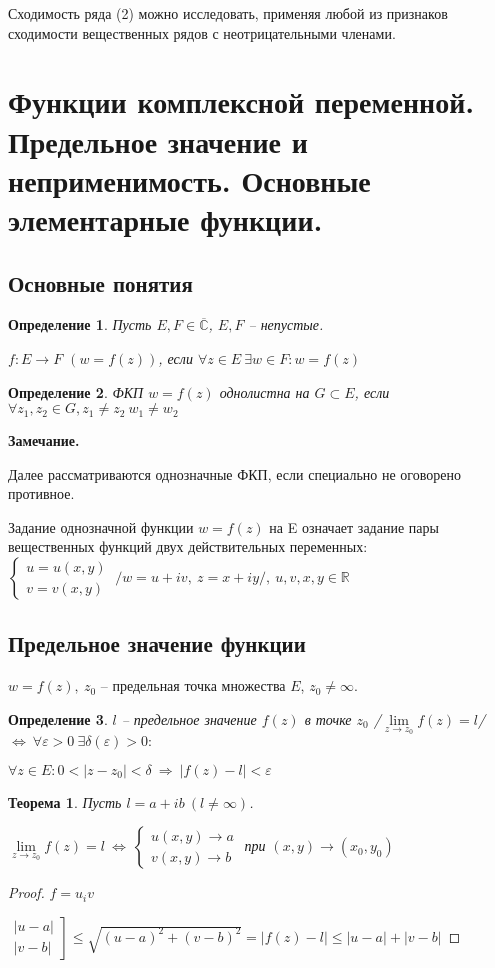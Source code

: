\documentclass[draft]{report}
\newcommand{\then}{\ \Rightarrow\ }
\newcommand{\R}{\mathbb{R}}
\renewcommand{\C}{\mathbb{C}}
\newcommand{\mlim}[1]{\underset{#1}{\lim}}
\newcommand{\LRA}{\Leftrightarrow}
\renewcommand{\bar}{\overline}
\newcommand{\e}{\varepsilon}
\newcommand{\CC}{\bar{\C}}
\newcommand{\sys}[1]{\left\{\begin{matrix}#1\end{matrix}\right.}
\newcommand{\opr}[1]{\begin{opred}#1\end{opred}}
\newtheorem*{theor}{Теорема}
\newtheorem*{opred}{Определение}
\theoremstyle{remark}
\begin{document}
Сходимость ряда (2) можно исследовать, применяя любой из признаков сходимости вещественных рядов с неотрицательными членами.

\section{Функции комплексной переменной. Предельное значение и неприменимость. Основные элементарные функции.}

\subsection{Основные понятия}

\opr{Пусть $E,F\in\CC$, $E,F$ -- непустые.

$f\colon E\to F$ $(w=f(z))$, если $\forall z\in E\ \exists w\in F\colon w=f(z)$}

\opr{ФКП $w=f(z)$ однолистна на $G\subset E$, если $\forall z_1,z_2\in G,z_1\neq z_2\ w_1\neq w_2$}

{\bfseries Замечание.}

Далее рассматриваются однозначные ФКП, если специально не оговорено противное.

Задание однозначной функции $w=f(z)$ на E означает задание пары вещественных функций двух действительных переменных: $\sys{u=u(x,y)\\v=v(x,y)}\ /w=u+iv,\ z=x+iy/,\ u,v,x,y\in\R$

\subsection{Предельное значение функции}

$w=f(z),\ z_0$ -- предельная точка множества $E$, $z_0\neq\infty$.

\opr{$l$ -- предельное значение $f(z)$ в точке $z_0$ /$\mlim{z\to z_0}f(z)=l$/ $\LRA\ \forall\e>0\ \exists\delta(\e)>0\colon$

$\forall z\in E\colon 0<|z-z_0|<\delta \then |f(z)-l|<\e$}

\begin{theor}
Пусть $l=a+ib\ (l\neq\infty)$.

$\mlim{z\to z_0}f(z)=l\ \LRA\ \sys{u(x,y)\to a \\ v(x,y)\to b}$ при $(x,y)\to(x_0,y_0)$
\end{theor}

\begin{proof}
$f=u_iv$

$\left.\begin{matrix}|u-a|\\|v-b|\end{matrix}\right]\leq\sqrt{(u-a)^2+(v-b)^2}=|f(z)-l|\leq|u-a|+|v-b|$
\end{proof}
\end{document}
